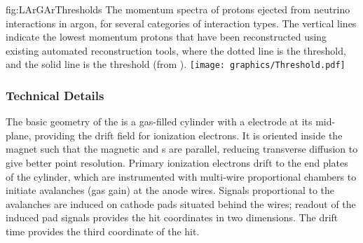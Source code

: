 \begin{dunefigure}{fig:LArGArThresholds}
{The momentum spectra of protons ejected from neutrino interactions in argon, for several categories of interaction types. The vertical lines indicate the lowest momentum protons that have been reconstructed using existing automated reconstruction tools, where the dotted line is the  threshold, and the solid line is the  threshold (from ).}
    \texttt{[image: graphics/Threshold.pdf]}
\end{dunefigure}


\subsubsection{ Technical Details}
The basic geometry of the  is a gas-filled cylinder with a  electrode at its mid-plane, providing the drift field for ionization electrons. It is oriented inside the magnet such that the magnetic and \efield{}s are parallel, reducing transverse diffusion to give better point resolution. Primary ionization electrons drift to the end plates of the cylinder, which are instrumented with multi-wire proportional chambers to initiate avalanches (gas gain) at the anode wires.  Signals proportional to the avalanches are induced on cathode pads situated behind the wires; readout of the induced pad signals provides the hit coordinates in two dimensions.  The drift time provides the third coordinate of the hit.


